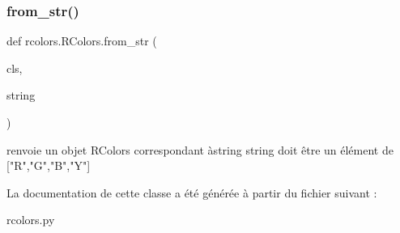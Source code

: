 \subsubsection{\texorpdfstring{from\+\_\+str()}{from\_str()}}
{\footnotesize\ttfamily def rcolors.\+R\+Colors.\+from\+\_\+str (\begin{DoxyParamCaption}\item[{}]{cls,  }\item[{}]{string }\end{DoxyParamCaption})}

\begin{DoxyVerb}renvoie un objet RColors correspondant àstring 
string doit être un élément de ["R","G","B","Y"]
\end{DoxyVerb}
 

La documentation de cette classe a été générée à partir du fichier suivant \+:\begin{DoxyCompactItemize}
\item 
rcolors.\+py\end{DoxyCompactItemize}
